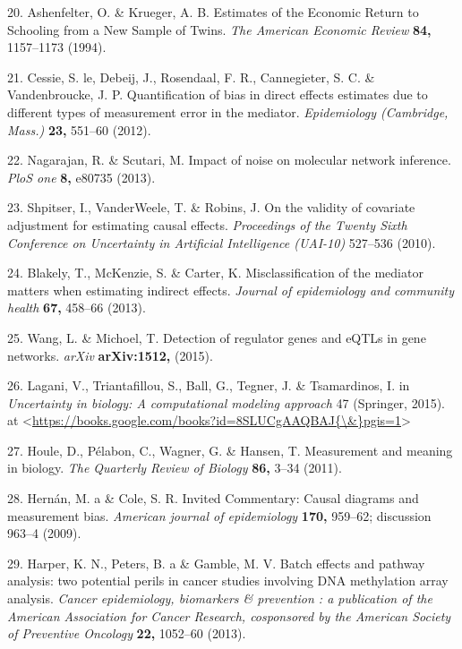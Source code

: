 \documentclass[]{article}
\begin{document}
\hypertarget{ref-Ashenfelter1994}{}
20. Ashenfelter, O. \& Krueger, A. B. Estimates of the Economic Return
to Schooling from a New Sample of Twins. \emph{The American Economic
Review} \textbf{84,} 1157--1173 (1994).

\hypertarget{ref-LeCessie2012}{}
21. Cessie, S. le, Debeij, J., Rosendaal, F. R., Cannegieter, S. C. \&
Vandenbroucke, J. P. Quantification of bias in direct effects estimates
due to different types of measurement error in the mediator.
\emph{Epidemiology (Cambridge, Mass.)} \textbf{23,} 551--60 (2012).

\hypertarget{ref-Nagarajan2013}{}
22. Nagarajan, R. \& Scutari, M. Impact of noise on molecular network
inference. \emph{PloS one} \textbf{8,} e80735 (2013).

\hypertarget{ref-Shpitser2010}{}
23. Shpitser, I., VanderWeele, T. \& Robins, J. On the validity of
covariate adjustment for estimating causal effects. \emph{Proceedings of
the Twenty Sixth Conference on Uncertainty in Artificial Intelligence
(UAI-10)} 527--536 (2010).

\hypertarget{ref-Blakely2013}{}
24. Blakely, T., McKenzie, S. \& Carter, K. Misclassification of the
mediator matters when estimating indirect effects. \emph{Journal of
epidemiology and community health} \textbf{67,} 458--66 (2013).

\hypertarget{ref-Wang2015}{}
25. Wang, L. \& Michoel, T. Detection of regulator genes and eQTLs in
gene networks. \emph{arXiv} \textbf{arXiv:1512,} (2015).

\hypertarget{ref-Lagani2015}{}
26. Lagani, V., Triantafillou, S., Ball, G., Tegner, J. \& Tsamardinos,
I. in \emph{Uncertainty in biology: A computational modeling approach}
47 (Springer, 2015). at
\textless{}\href{https://books.google.com/books?id=8SLUCgAAQBAJ\%7B/\&\%7Dpgis=1}{https://books.google.com/books?id=8SLUCgAAQBAJ\{\textbackslash{}\&\}pgis=1}\textgreater{}

\hypertarget{ref-Houle2011}{}
27. Houle, D., Pélabon, C., Wagner, G. \& Hansen, T. Measurement and
meaning in biology. \emph{The Quarterly Review of Biology} \textbf{86,}
3--34 (2011).

\hypertarget{ref-Hernan2009}{}
28. Hernán, M. a \& Cole, S. R. Invited Commentary: Causal diagrams and
measurement bias. \emph{American journal of epidemiology} \textbf{170,}
959--62; discussion 963--4 (2009).

\hypertarget{ref-Harper2013}{}
29. Harper, K. N., Peters, B. a \& Gamble, M. V. Batch effects and
pathway analysis: two potential perils in cancer studies involving DNA
methylation array analysis. \emph{Cancer epidemiology, biomarkers \&
prevention : a publication of the American Association for Cancer
Research, cosponsored by the American Society of Preventive Oncology}
\textbf{22,} 1052--60 (2013).
\end{document}
